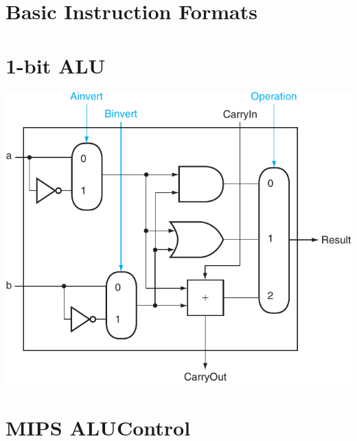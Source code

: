 \documentclass[11pt]{article}
\begin{document}
\begin{minipage}[t]{0.35\linewidth}
	\section*{Basic Instruction Formats}
	\vspace{1em}
	

	\vspace{2ex}

	\section*{1-bit ALU}

	\includegraphics[width=\linewidth]{mips-cpu/alu.pdf}

	\vspace{1ex}
	\vspace{0.5mm}
	
\end{minipage}



\vfill

\begin{minipage}[t]{\linewidth}
	\begin{minipage}[t]{0.5\textwidth}
		\section*{MIPS ALUControl}
		
	\end{minipage}
	\begin{minipage}[t]{0.28\textwidth}
	\end{minipage}
\end{minipage}
\end{document}
